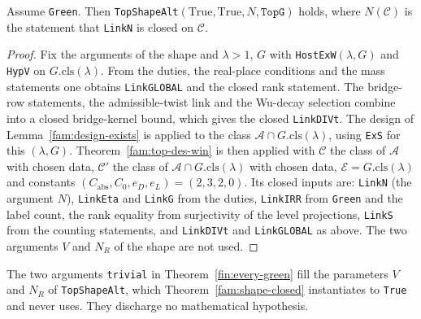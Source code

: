 \begin{theorem}\label{fam:shape-closed}
Assume \texttt{Green}. Then \texttt{TopShapeAlt}$(\mathrm{True},\mathrm{True},N,\texttt{TopG})$ holds, where $N(\mathcal C)$ is the statement that \texttt{LinkN} is closed on $\mathcal C$.
\end{theorem}
\begin{proof}
Fix the arguments of the shape and $\lambda>1$, $G$ with \texttt{HostExW}$(\lambda,G)$ and \texttt{HypV} on $G.\mathrm{cls}(\lambda)$. From the duties, the real-place conditions and the mass statements one obtains \texttt{LinkGLOBAL} and the closed rank statement. The bridge-row statements, the admissible-twist link and the Wu-decay selection combine into a closed bridge-kernel bound, which gives the closed \texttt{LinkDIVt}. The design of Lemma~\ref{fam:design-exists} is applied to the class $\mathcal A\cap G.\mathrm{cls}(\lambda)$, using \texttt{ExS} for this $(\lambda,G)$. Theorem~\ref{fam:top-des-win} is then applied with $\mathcal C$ the class of $\mathcal A$ with chosen data, $\mathcal C'$ the class of $\mathcal A\cap G.\mathrm{cls}(\lambda)$ with chosen data, $\mathcal E=G.\mathrm{cls}(\lambda)$ and constants $(C_{\mathrm{abs}},C_0,e_D,e_L)=(2,3,2,0)$. Its closed inputs are: \texttt{LinkN} (the argument $N$), \texttt{LinkEta} and \texttt{LinkG} from the duties, \texttt{LinkIRR} from \texttt{Green} and the label count, the rank equality from surjectivity of the level projections, \texttt{LinkS} from the counting statements, and \texttt{LinkDIVt} and \texttt{LinkGLOBAL} as above. The two arguments $V$ and $N_R$ of the shape are not used.
\end{proof}



\begin{remark}\label{fam:rem-trivial}
The two arguments \texttt{trivial} in Theorem~\ref{fin:every-green} fill the parameters $V$ and $N_R$ of \texttt{TopShapeAlt}, which Theorem~\ref{fam:shape-closed} instantiates to \texttt{True} and never uses. They discharge no mathematical hypothesis.
\end{remark}

